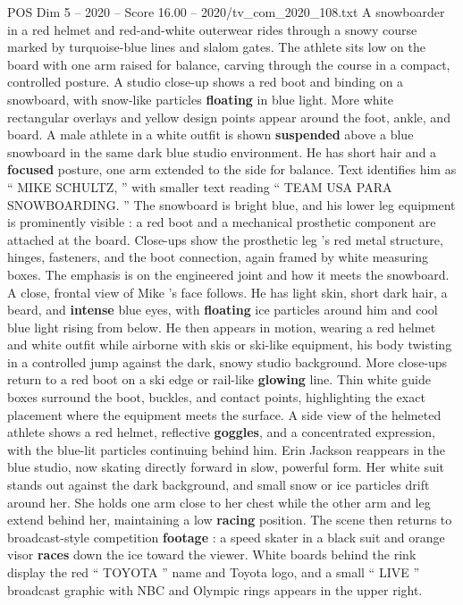 \begin{textsample}{POS Dim 5 – 2020 – Score 16.00 – 2020/tv\_com\_2020\_108.txt}
A snowboarder in a red helmet and red-and-white outerwear rides through a snowy course marked by turquoise-blue lines and slalom gates.
The athlete sits low on the board with one arm raised for balance, carving through the course in a compact, controlled posture.
A studio close-up shows a red boot and binding on a snowboard, with snow-like particles \textbf{floating} in blue light.
More white rectangular overlays and yellow design points appear around the foot, ankle, and board.
A male athlete in a white outfit is shown \textbf{suspended} above a blue snowboard in the same dark blue studio environment.
He has short hair and a \textbf{focused} posture, one arm extended to the side for balance.
Text identifies him as “ MIKE SCHULTZ, ” with smaller text reading “ TEAM USA PARA SNOWBOARDING. ” The snowboard is bright blue, and his lower leg equipment is prominently visible : a red boot and a mechanical prosthetic component are attached at the board.
Close-ups show the prosthetic leg ’s red metal structure, hinges, fasteners, and the boot connection, again framed by white measuring boxes.
The emphasis is on the engineered joint and how it meets the snowboard.
A close, frontal view of Mike ’s face follows.
He has light skin, short dark hair, a beard, and \textbf{intense} blue eyes, with \textbf{floating} ice particles around him and cool blue light rising from below.
He then appears in motion, wearing a red helmet and white outfit while airborne with skis or ski-like equipment, his body twisting in a controlled jump against the dark, snowy studio background.
More close-ups return to a red boot on a ski edge or rail-like \textbf{glowing} line.
Thin white guide boxes surround the boot, buckles, and contact points, highlighting the exact placement where the equipment meets the surface.
A side view of the helmeted athlete shows a red helmet, reflective \textbf{goggles}, and a concentrated expression, with the blue-lit particles continuing behind him.
Erin Jackson reappears in the blue studio, now skating directly forward in slow, powerful form.
Her white suit stands out against the dark background, and small snow or ice particles drift around her.
She holds one arm close to her chest while the other arm and leg extend behind her, maintaining a low \textbf{racing} position.
The scene then returns to broadcast-style competition \textbf{footage} : a speed skater in a black suit and orange visor \textbf{races} down the ice toward the viewer.
White boards behind the rink display the red “ TOYOTA ” name and Toyota logo, and a small “ LIVE ” broadcast graphic with NBC and Olympic rings appears in the upper right.

\end{textsample}
